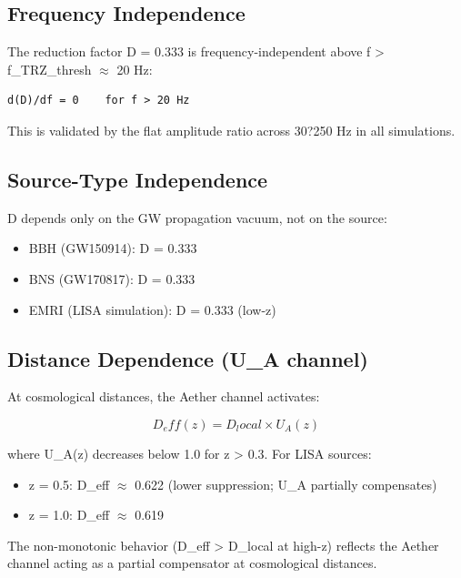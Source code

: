 \documentclass[12pt,a4paper]{article}
\begin{document}
\subsection{Frequency Independence}

The reduction factor D = 0.333 is frequency-independent above f > f\_{TRZ\_thresh} $\approx$ 20 Hz:

\begin{verbatim}
d(D)/df = 0    for f > 20 Hz
\end{verbatim}

This is validated by the flat amplitude ratio across 30?250 Hz in all simulations.

\subsection{Source-Type Independence}

D depends only on the GW propagation vacuum, not on the source:

\begin{itemize}
  \item BBH (GW150914): D = 0.333
  \item BNS (GW170817): D = 0.333
  \item EMRI (LISA simulation): D = 0.333 (low-z)
\end{itemize}

\subsection{Distance Dependence (U\_A channel)}

At cosmological distances, the Aether channel activates:

\begin{equation}
D_eff(z) = D_local \times U_A(z)
\end{equation}

where U\_A(z) decreases below 1.0 for z > 0.3. For LISA sources:

\begin{itemize}
  \item z = 0.5: D\_eff $\approx$ 0.622 (lower suppression; U\_A partially compensates)
  \item z = 1.0: D\_eff $\approx$ 0.619
\end{itemize}

The non-monotonic behavior (D\_eff > D\_local at high-z) reflects the Aether channel acting as a partial compensator at cosmological distances.
\end{document}
